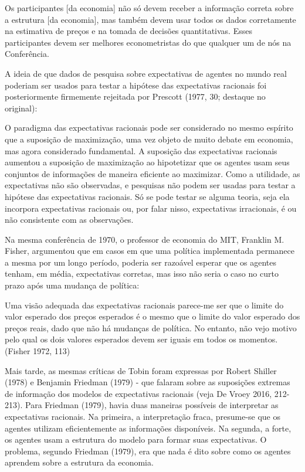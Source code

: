 \documentclass[a4paper,12pt]{article}[abntex2]
\begin{document}
Os participantes [da economia] não só devem receber a informação correta sobre a estrutura [da economia], mas também devem usar todos os dados corretamente na estimativa de preços e na tomada de decisões quantitativas. Esses participantes devem ser melhores econometristas do que qualquer um de nós na Conferência.

A ideia de que dados de pesquisa sobre expectativas de agentes no mundo real poderiam ser usados para testar a hipótese das expectativas racionais foi posteriormente firmemente rejeitada por Prescott (1977, 30; destaque no original):

O paradigma das expectativas racionais pode ser considerado no mesmo espírito que a suposição de maximização, uma vez objeto de muito debate em economia, mas agora considerado fundamental. A suposição das expectativas racionais aumentou a suposição de maximização ao hipotetizar que os agentes usam seus conjuntos de informações de maneira eficiente ao maximizar. Como a utilidade, as expectativas não são observadas, e pesquisas não podem ser usadas para testar a hipótese das expectativas racionais. Só se pode testar se alguma teoria, seja ela incorpora expectativas racionais ou, por falar nisso, expectativas irracionais, é ou não consistente com as observações.

Na mesma conferência de 1970, o professor de economia do MIT, Franklin M. Fisher, argumentou que em casos em que uma política implementada permanece a mesma por um longo período, poderia ser razoável esperar que os agentes tenham, em média, expectativas corretas, mas isso não seria o caso no curto prazo após uma mudança de política:

Uma visão adequada das expectativas racionais parece-me ser que o limite do valor esperado dos preços esperados é o mesmo que o limite do valor esperado dos preços reais, dado que não há mudanças de política. No entanto, não vejo motivo pelo qual os dois valores esperados devem ser iguais em todos os momentos. (Fisher 1972, 113)

Mais tarde, as mesmas críticas de Tobin foram expressas por Robert Shiller (1978) e Benjamin Friedman (1979) - que falaram sobre as suposições extremas de informação dos modelos de expectativas racionais (veja De Vroey 2016, 212-213). Para Friedman (1979), havia duas maneiras possíveis de interpretar as expectativas racionais. Na primeira, a interpretação fraca, presume-se que os agentes utilizam eficientemente as informações disponíveis. Na segunda, a forte, os agentes usam a estrutura do modelo para formar suas expectativas. O problema, segundo Friedman (1979), era que nada é dito sobre como os agentes aprendem sobre a estrutura da economia.
\end{document}
